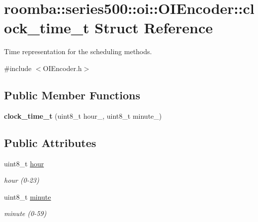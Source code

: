 \hypertarget{structroomba_1_1series500_1_1oi_1_1_o_i_encoder_1_1clock__time__t}{\section{roomba\+:\+:series500\+:\+:oi\+:\+:O\+I\+Encoder\+:\+:clock\+\_\+time\+\_\+t Struct Reference}
\label{structroomba_1_1series500_1_1oi_1_1_o_i_encoder_1_1clock__time__t}
}


Time representation for the scheduling methods.  




{\ttfamily \#include $<$O\+I\+Encoder.\+h$>$}

\subsection*{Public Member Functions}
\begin{DoxyCompactItemize}
\item 
\hypertarget{structroomba_1_1series500_1_1oi_1_1_o_i_encoder_1_1clock__time__t_a41c47bdf7978a52c91a5b83f3e269ff6}{{\bfseries clock\+\_\+time\+\_\+t} (uint8\+\_\+t hour\+\_, uint8\+\_\+t minute\+\_)}\label{structroomba_1_1series500_1_1oi_1_1_o_i_encoder_1_1clock__time__t_a41c47bdf7978a52c91a5b83f3e269ff6}

\end{DoxyCompactItemize}
\subsection*{Public Attributes}
\begin{DoxyCompactItemize}
\item 
\hypertarget{structroomba_1_1series500_1_1oi_1_1_o_i_encoder_1_1clock__time__t_a51b3ad60a0a77de31cd4bf301aa90db2}{uint8\+\_\+t \hyperlink{structroomba_1_1series500_1_1oi_1_1_o_i_encoder_1_1clock__time__t_a51b3ad60a0a77de31cd4bf301aa90db2}{hour}}\label{structroomba_1_1series500_1_1oi_1_1_o_i_encoder_1_1clock__time__t_a51b3ad60a0a77de31cd4bf301aa90db2}

\begin{DoxyCompactList}\small\item\em hour (0-\/23) \end{DoxyCompactList}\item 
\hypertarget{structroomba_1_1series500_1_1oi_1_1_o_i_encoder_1_1clock__time__t_aefda9ffa047ff2693f571ca718fed84c}{uint8\+\_\+t \hyperlink{structroomba_1_1series500_1_1oi_1_1_o_i_encoder_1_1clock__time__t_aefda9ffa047ff2693f571ca718fed84c}{minute}}\label{structroomba_1_1series500_1_1oi_1_1_o_i_encoder_1_1clock__time__t_aefda9ffa047ff2693f571ca718fed84c}

\begin{DoxyCompactList}\small\item\em minute (0-\/59) \end{DoxyCompactList}\end{DoxyCompactItemize}



